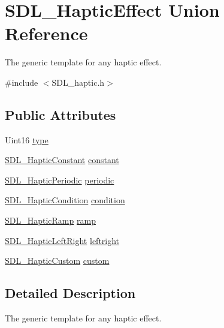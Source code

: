\hypertarget{union_s_d_l___haptic_effect}{}\section{S\+D\+L\+\_\+\+Haptic\+Effect Union Reference}
\label{union_s_d_l___haptic_effect}


The generic template for any haptic effect.  




{\ttfamily \#include $<$S\+D\+L\+\_\+haptic.\+h$>$}

\subsection*{Public Attributes}
\begin{DoxyCompactItemize}
\item 
Uint16 \mbox{\hyperlink{union_s_d_l___haptic_effect_a5ff6cfd8da91537091e9a6c2108cb179}{type}}
\item 
\mbox{\hyperlink{struct_s_d_l___haptic_constant}{S\+D\+L\+\_\+\+Haptic\+Constant}} \mbox{\hyperlink{union_s_d_l___haptic_effect_ac435275e9683d6cc5d65b9c7cc2ec659}{constant}}
\item 
\mbox{\hyperlink{struct_s_d_l___haptic_periodic}{S\+D\+L\+\_\+\+Haptic\+Periodic}} \mbox{\hyperlink{union_s_d_l___haptic_effect_a8320ec4db6ec1dc1d30feb62ee2a2f04}{periodic}}
\item 
\mbox{\hyperlink{struct_s_d_l___haptic_condition}{S\+D\+L\+\_\+\+Haptic\+Condition}} \mbox{\hyperlink{union_s_d_l___haptic_effect_aa8fdd1ba202ccd7e61f48ef9977080d2}{condition}}
\item 
\mbox{\hyperlink{struct_s_d_l___haptic_ramp}{S\+D\+L\+\_\+\+Haptic\+Ramp}} \mbox{\hyperlink{union_s_d_l___haptic_effect_a1d32ef4c2d1cc89dc938b392f6ad81bd}{ramp}}
\item 
\mbox{\hyperlink{struct_s_d_l___haptic_left_right}{S\+D\+L\+\_\+\+Haptic\+Left\+Right}} \mbox{\hyperlink{union_s_d_l___haptic_effect_a3c254b81c1ff41c7888eee0cd0076a12}{leftright}}
\item 
\mbox{\hyperlink{struct_s_d_l___haptic_custom}{S\+D\+L\+\_\+\+Haptic\+Custom}} \mbox{\hyperlink{union_s_d_l___haptic_effect_a0b2d2af28c515cc39896b2b7c23019d2}{custom}}
\end{DoxyCompactItemize}


\subsection{Detailed Description}
The generic template for any haptic effect. 

